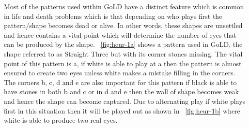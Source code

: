\documentclass{l4proj}
\begin{document}
Most of the patterns used within GoLD have a distinct feature which is common in life and death problems which is that depending on who plays first the pattern/shape becomes dead or alive. In other words, these shapes are unsettled and hence contains a vital point which will determine the number of eyes that can be produced by the shape. ~\autoref{fig:heur-1a} shows a pattern used in GoLD, the shape referred to as Straight Three but with its corner stones missing. The vital point of this pattern is a, if white is able to play at a then the pattern is almost ensured to create two eyes unless white makes a mistake filling in the corners. The corners b, c, d and e are also important for this pattern if black is able to have stones in both b and c  or in d and e then the wall of shape becomes weak and hence the shape can become captured. Due to alternating play if white plays first in this situation then it will be played out as shown in ~\autoref{fig:heur-1b} where white is able to produce two real eyes.
\end{document}
